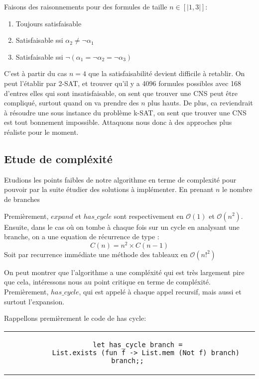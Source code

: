 \documentclass{paper}
\begin{document}
Faisons des raisonnements pour des formules de taille $n\in [|1, 3|]$:
\begin{enumerate}
    \item Toujours satisfaisable
    \item Satisfaisable ssi $\alpha_2 \neq \lnot\alpha_1$
    \item Satisfaisable ssi $\lnot(\alpha_1 = \lnot\alpha_2 = \lnot\alpha_3)$
\end{enumerate}
C'est à partir du cas $n=4$ que la satisfaisabilité devient difficile à retablir. On peut l'établir par 2-SAT, et trouver qu'il y a 
4096 formules possibles avec 168 d'entres elles qui sont insatisfaisable, on sent que trouver une CNS peut être compliqué, surtout quand
on va prendre des $n$ plus hauts.
De plus, ca reviendrait à résoudre une sous instance du problème k-SAT, on sent que trouver une CNS est tout bonnement impossible.
Attaquons nous donc à des approches plus réaliste pour le moment.



\subsection{Etude de compléxité}

Etudions les points faibles de notre algorithme en terme de complexité pour pouvoir par la suite étudier des solutions à implémenter.
En prenant $n$ le nombre de branches

Premièrement, $expand$ et $has\_cycle$ sont respectivement en $\mathcal{O}(1)$ et $\mathcal{O}(n^2)$.
Ensuite, dans le cas où on tombe à chaque fois sur un cycle en analysant une branche, on a une equation de récurrence de type :
$$C(n) = n^2\times C(n-1)$$
Soit par recurrence immédiate une méthode des tableaux en $\mathcal{O}(n!^2)$

On peut montrer que l'algorithme a une compléxité qui est très largement pire que cela, intéressons nous au point critique en terme de compléxité.
Premièrement, $has\_cycle$, qui est appelé à chaque appel recursif, mais aussi et surtout l'expansion.

Rappellons premièrement le code de has cycle: 

\begin{tabular}{c}
    \begin{lstlisting}
    let has_cycle branch =
        List.exists (fun f -> List.mem (Not f) branch) branch;; 
    \end{lstlisting}
\end{tabular}
\end{document}
